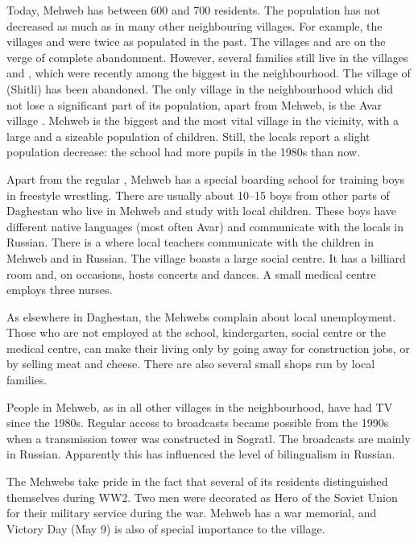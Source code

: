 \documentclass[output=paper]{langsci/langscibook}
\begin{document}
Today, Mehweb has between 600 and 700 residents. The population has not
decreased as much as in many other neighbouring villages. For example, the 
villages  and  were twice as populated in the past. The 
villages  and  are on the verge of complete abandonment. However, several
families still live in the  villages  and , which were
recently among the biggest in the neighbourhood. The  village of
 (Shitli) has been abandoned. The only village in the
neighbourhood which did not lose a significant part of its population,
apart from Mehweb, is the Avar village . Mehweb is the biggest and
the most vital village in the vicinity, with a large  and a sizeable population of 
children. Still, the locals report a slight
population decrease: the school had more pupils in the 1980s than now.

Apart from the regular , Mehweb has a special boarding school for
training boys in freestyle wrestling. There are usually about 10–15 boys
from other parts of Daghestan who live in Mehweb and study with local
children. These boys have different native languages (most often Avar)
and communicate with the locals in Russian.
%
There is a  where local teachers communicate with the
children in Mehweb and in Russian.  The village boasts a large
social centre. It has a billiard room and, on occasions, hosts concerts
and dances. A small medical centre employs three nurses.

As elsewhere in Daghestan, the Mehwebs complain about local
unemployment. Those who are not employed at the school, kindergarten,
social centre or the medical centre, can make their living only by going
away for construction jobs, or by selling meat and cheese. There are
also several small shops run by local families.

People in Mehweb, as in all other villages in the neighbourhood, have
had TV since the 1980s. Regular access to broadcasts became possible
from the 1990s when a transmission tower was constructed in Sogratl. The broadcasts are mainly in Russian. Apparently this has influenced the
level of bilingualism in Russian.

The Mehwebs take pride in the fact that several of its residents
distinguished themselves during WW2. Two men were decorated as Hero of
the Soviet Union for their military service during the war. Mehweb has a
war memorial, and Victory Day (May 9) is also of special importance to the
village.
\end{document}
